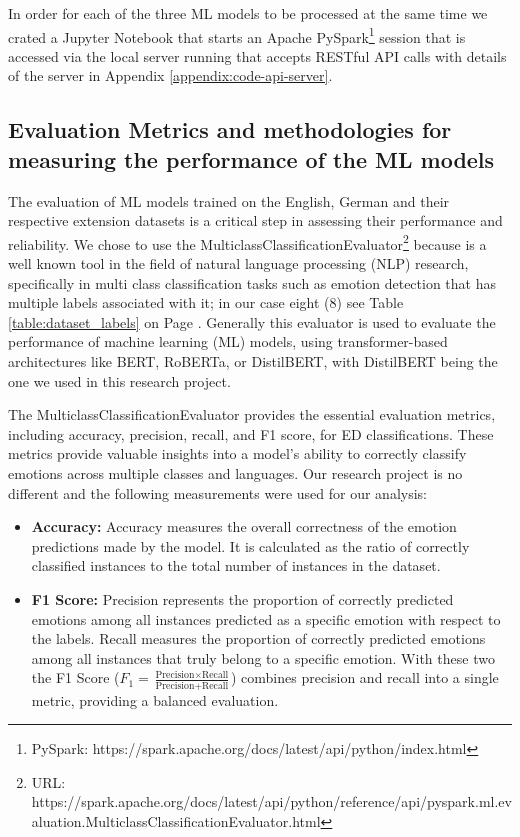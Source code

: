 \documentclass[11pt]{article}
\begin{document}
In order for each of the three ML models to be processed at the same time we crated a Jupyter Notebook that starts an Apache PySpark\footnote{PySpark: https://spark.apache.org/docs/latest/api/python/index.html} session that is accessed via the local server running that accepts RESTful API calls with details of the server in Appendix \ref{appendix:code-api-server}.

\subsection{Evaluation Metrics and methodologies for measuring the performance of the ML models}
\label{sec:evaluation-metrics-and-methodologies}
The evaluation of ML models trained on the English, German and their respective extension datasets is a critical step in assessing their performance and reliability. We chose to use the MulticlassClassificationEvaluator\footnote{URL: https://spark.apache.org/docs/latest/api/python/reference/api/pyspark.ml.evaluation.MulticlassClassificationEvaluator.html} because is a well known tool in the field of natural language processing (NLP) research, specifically in multi class classification tasks such as emotion detection that has multiple labels associated with it; in our case eight (8) see Table \ref{table:dataset_labels} on Page \pageref{table:dataset_labels}. Generally this evaluator is used to evaluate the performance of machine learning (ML) models, using transformer-based architectures like BERT, RoBERTa, or DistilBERT\cite{Sanh2019-DistilBERT-AD}, with DistilBERT\cite{Sanh2019-DistilBERT-AD} being the one we used in this research project.

The MulticlassClassificationEvaluator provides the essential evaluation metrics, including accuracy, precision, recall, and F1 score, for ED classifications. These metrics provide valuable insights into a model's ability to correctly classify emotions across multiple classes and languages. Our research project is no different and the following measurements were used for our analysis:
\begin{itemize}

\item \textbf{Accuracy:} Accuracy measures the overall correctness of the emotion predictions made by the model. It is calculated as the ratio of correctly classified instances to the total number of instances in the dataset.

\item \textbf{F1 Score:} Precision represents the proportion of correctly predicted emotions among all instances predicted as a specific emotion with respect to the labels. Recall measures the proportion of correctly predicted emotions among all instances that truly belong to a specific emotion. With these two the F1 Score ($F_{1}=\frac{\text{Precision} \times \text{Recall}}{\text{Precision} + \text{Recall}}$) combines precision and recall into a single metric, providing a balanced evaluation.

\end{itemize}
\end{document}

